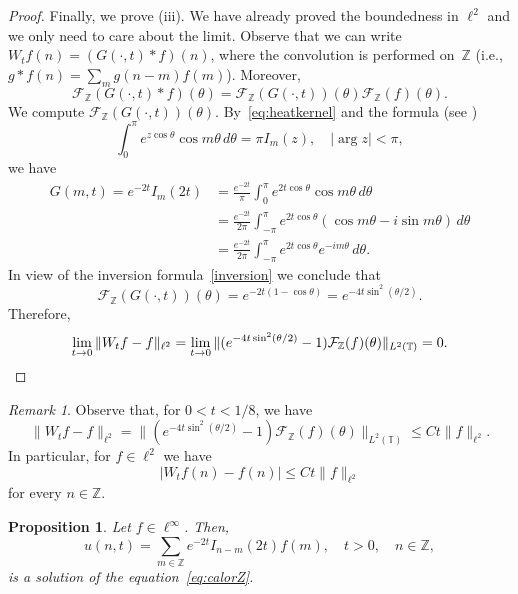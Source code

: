 \documentclass[11pt]{amsart}
\numberwithin{equation}{section}
\newcommand{\Z}{\mathbb{Z}}
\newcommand{\T}{\mathbb{T}}
\theoremstyle{plain}
\newtheorem{prop}{Proposition}
\theoremstyle{remark}
\newtheorem{rem}{Remark}
\begin{document}
\begin{proof}
Finally, we prove (iii). We have already proved the boundedness in $\ell^2$ and we only need to care about the limit. Observe that we can write $W_tf(n) = (G(\cdot,t)\ast f) (n)$, where the convolution is performed on~$\Z$ (i.e., $g\ast f(n) = \sum_{m} g(n-m)f(m)$). Moreover,
\[
\mathcal{F}_{\Z}(G(\cdot,t)\ast f)(\theta)
= \mathcal{F}_{\Z}(G(\cdot,t))(\theta)\mathcal{F}_{\Z}(f)(\theta).
\]
We compute $\mathcal{F}_{\Z}(G(\cdot,t))(\theta)$. By~\eqref{eq:heatkernel}
and the formula (see \cite[p.~456]{Prudnikov})
\[
\int_0^{\pi}e^{z\cos\theta}\cos m\theta\,d\theta = \pi I_m(z),\quad |\arg z|<\pi,
\]
we have
\begin{align*}
G(m,t) = e^{-2t}I_m(2t)
&= \frac{e^{-2t}}{\pi} \int_0^{\pi}e^{2t\cos\theta}\cos m\theta\,d\theta\\
&= \frac{e^{-2t}}{2\pi} \int_{-\pi}^{\pi}e^{2t\cos\theta}(\cos m\theta-i\sin m\theta)\,d\theta\\
&= \frac{e^{-2t}}{2\pi} \int_{-\pi}^{\pi}e^{2t\cos\theta}e^{-im\theta}\,d\theta.
\end{align*}
In view of the inversion formula~\eqref{inversion}
we conclude that
\begin{equation*}
\mathcal{F}_{\Z}(G(\cdot,t))(\theta) = e^{-2t(1-\cos\theta)}
= e^{-4t\sin^2(\theta/2)}.
\end{equation*}
Therefore,
\[
\lim_{t\to 0} \|W_tf-f\|_{\ell^2}
= \lim_{t\to 0} \|(e^{-4t\sin^2(\theta/2)} -1) \mathcal{F}_{\Z}(f)(\theta)\|_{L^2(\T)} = 0.
\qedhere
\]
\end{proof}

\begin{rem}
Observe that, for $0<t < 1/8$, we have
\begin{equation*}
\|W_tf-f\|_{\ell^2}
= \|(e^{-4t\sin^2(\theta/2)} -1)\mathcal{F}_{\Z}(f)(\theta)\|_{L^2(\T)}
\le C t \|f\|_{\ell^2}.
\end{equation*}
In particular, for $f\in \ell^2$ we have
\begin{equation}\label{util}
|W_tf(n)-f(n)| \le Ct\|f\|_{\ell^2}
\end{equation}
for every $n \in \Z$.
\end{rem}

\begin{prop}
\label{prop:solutionHeat}
Let $f\in \ell^\infty$. Then,
\[
  u(n,t) = \sum_{m\in\Z} e^{-2t} I_{n-m}(2t) f(m),
  \quad t>0,\quad n\in \Z,
\]
is a solution of the equation~\eqref{eq:calorZ}.
\end{prop}
\end{document}
